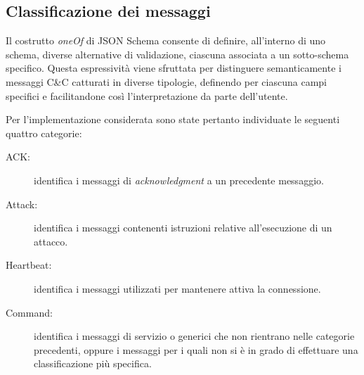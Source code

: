 
\subsection{Classificazione dei messaggi} %


Il costrutto \emph{oneOf} di JSON Schema consente di definire, all'interno di uno schema, diverse alternative di validazione, ciascuna associata a un sotto-schema specifico. Questa espressività viene sfruttata per distinguere semanticamente i messaggi C\&C catturati in diverse tipologie, definendo per ciascuna campi specifici e facilitandone così l'interpretazione da parte dell'utente.

Per l'implementazione considerata sono state pertanto individuate le seguenti quattro categorie:

\begin{description}
    \item[ACK:] identifica i messaggi di \emph{acknowledgment} a un precedente messaggio.
    \item[Attack:] identifica i messaggi contenenti istruzioni relative all'esecuzione di un attacco.
    \item[Heartbeat:] identifica i messaggi utilizzati per mantenere attiva la connessione. %
    \item[Command:] identifica i messaggi di servizio o generici che non rientrano nelle categorie precedenti, oppure i messaggi per i quali non si è in grado di effettuare una classificazione più specifica.
\end{description}

